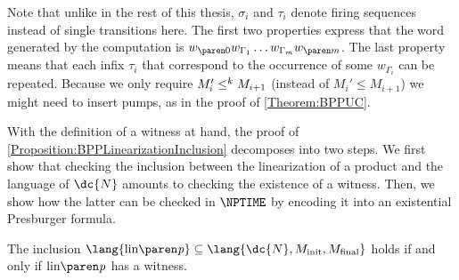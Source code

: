 \documentclass[../../diss.tex]{subfiles}
\begin{document}
Note that unlike in the rest of this thesis, $\sigma_i$ and $\tau_i$ denote firing sequences instead of single transitions here.
The first two properties express that the word generated by the computation is $\dtr{w}{0} w_{\Gamma_1} \ldots w_{\Gamma_m} \dtr{w}{m}$.
The last property means that each infix $\tau_i$ that correspond to the occurrence of some $w_{\Gamma_i}$ can be repeated.
Because we only require $M_i'\leq^k M_{i+1}$ (instead of $M_i'\leq M_{i+1}$) we might need to insert pumps, as in the proof of \cref{Theorem:BPPUC}.

With the definition of a witness at hand, the proof of \cref{Proposition:BPPLinearizationInclusion} decomposes into two steps.
We first show that checking the inclusion between the linearization of a product and the language of $\dc{N}$ amounts to checking the existence of a witness.
Then, we show how the latter can be checked in $\NPTIME$ by encoding it into an existential Presburger formula.

\begin{lemma}%
\label{Lemma:BPPSREDCWitness}%
    The inclusion $\lang{\linof{\product}} \subseteq \lang{\dc{N}, \Minit,\Mfinal}$ holds if and only if $\linof{\product}$ has a witness.
\end{lemma}
\end{document}
